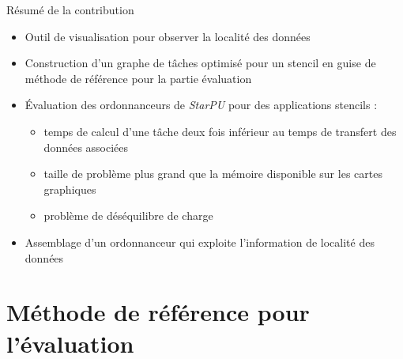 \documentclass[9pt]{beamer}
\begin{document}
\begin{frame}{\textcolor{inriaGrey}{Résumé de la contribution}}
  \vfill
  \begin{itemize}
  \item<1-> Outil de visualisation pour observer la localité des données
    \vfill
  \item<2-> Construction d'un graphe de tâches optimisé pour un stencil en guise
    de méthode de référence pour la partie évaluation \vfill
  \item<3-> Évaluation des ordonnanceurs de \textit{StarPU} pour des applications
    stencils :
    \vfill
    \begin{itemize}
    \item<4-> temps de calcul d'une tâche deux fois inférieur au temps de
      transfert des données associées \vfill
    \item<5-> taille de problème plus grand que la mémoire disponible sur les
      cartes graphiques \vfill
    \item<6-> problème de déséquilibre de charge
    \end{itemize}
    \vfill
  \item<7-> Assemblage d'un ordonnanceur qui exploite l'information de localité
    des données
  \end{itemize}
  \vfill
\end{frame}

\section{Méthode de référence pour l'évaluation}
\end{document}
